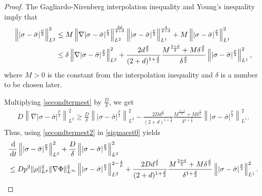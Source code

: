 \documentclass[10pt,twoside,reqno]{amsart}
\numberwithin{figure}{section}
\numberwithin{equation}{section}
\theoremstyle{definition}
\newcommand{\1}{\mathbbm{1}}
\newcommand{\diff}{\,\mathrm{d}}
\begin{document}
\begin{proof}
The Gagliardo-Nirenberg interpolation inequality and Young's inequality imply that
\begin{align}
\left\||\sigma - \bar{\sigma}|^{\frac{p}{2}}\right\|_{L^2}^2 & \leq M \left\|\nabla |\sigma - \bar{\sigma}|^{\frac{p}{2}}\right\|_{L^2}^{\frac{2 d}{2 + d}} \left\||\sigma - \bar{\sigma}|^{\frac{p}{2}}\right\|_{L^1}^{\frac{4}{2 + d}} + M \left\||\sigma - \bar{\sigma}|^{\frac{p}{2}}\right\|_{L^1}^2\notag\\
& \leq \delta \left\|\nabla |\sigma - \bar{\sigma}|^{\frac{p}{2}}\right\|_{L^2}^2 + \frac{2 d^{\frac{d}{2}}}{(2 + d)^{1 + \frac{d}{2}}} \frac{M^{\frac{2 + d}{2}} +  M \delta^{\frac{d}{2}}}{\delta^{\frac{d}{2}}} \left\||\sigma - \bar{\sigma}|^{\frac{p}{2}}\right\|_{L^1}^2,
\label{secondtermest}
\end{align}
where $M > 0$ is the constant from the interpolation inequality and $\delta$ is a number to be chosen later.

Multiplying \eqref{secondtermest} by $\frac{D}{\delta}$, we get
\begin{align}
\label{secondtermest2}
D \left\|\nabla |\sigma - \bar{\sigma}|^{\frac{p}{2}}\right\|_{L^2}^2  \geq \frac{D}{\delta} \left\||\sigma - \bar{\sigma}|^{\frac{p}{2}}\right\|_{L^2}^2 - \frac{2 D d^{\frac{d}{2}}}{(2 + d)^{1 + \frac{d}{2}}} \frac{M^{\frac{2 + d}{2}} +  M \delta^{\frac{d}{2}}}{\delta^{1 + \frac{d}{2}}} \left\||\sigma - \bar{\sigma}|^{\frac{p}{2}}\right\|_{L^1}^2.
\end{align}
Thus, using \eqref{secondtermest2} in \eqref{sigmaest0} yields
\begin{align}
\label{beforeabsorb}
& \frac{\diff}{\diff{t}} \left\||\sigma - \bar{\sigma}|^{\frac{p}{2}}\right\|_{L^2}^2 + \frac{D}{\delta} \left\||\sigma - \bar{\sigma}|^{\frac{p}{2}}\right\|_{L^2}^2\notag\\
&\leq D p^2 \|\rho\|_{L^p}^2 \|\nabla \Phi\|_{L^\infty}^2 \left\||\sigma - \bar{\sigma}|^{\frac{p}{2}}\right\|_{L^2}^{2 - \frac{4}{p}} + \frac{2 D d^{\frac{d}{2}}}{(2 + d)^{1 + \frac{d}{2}}} \frac{M^{\frac{2 + d}{2}} +  M \delta^{\frac{d}{2}}}{\delta^{1 + \frac{d}{2}}} \left\||\sigma - \bar{\sigma}|^{\frac{p}{2}}\right\|_{L^1}^2.
\end{align}


\end{proof}
\end{document}
